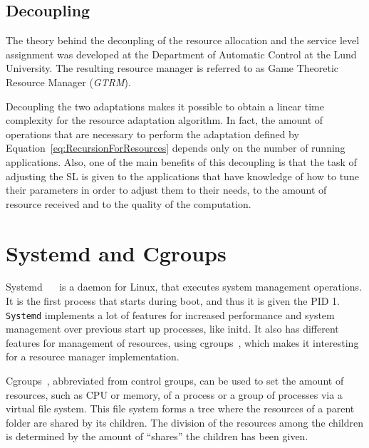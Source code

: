 \documentclass[nobiblatex]{LTHthesis}
\begin{document}
\subsection{Decoupling}

The theory behind the decoupling of the resource allocation and the service
level assignment was developed at the Department of Automatic Control at
the Lund University. The resulting resource manager is referred to as Game 
Theoretic Resource Manager (\emph{GTRM}).

Decoupling the two adaptations makes it possible to obtain a linear time
complexity for the resource adaptation algorithm. In fact, the amount of
operations that are necessary to perform the adaptation defined by
Equation~\ref{eq:RecursionForResources} depends only on the number of
running applications. Also, one of the main benefits of this decoupling is
that the task of adjusting the SL is given to the applications that have
knowledge of how to tune their parameters in order to adjust them to their
needs, to the amount of resource received and to the quality of the 
computation.

\section{Systemd and Cgroups}
\label{sec:systemdandcroups}
Systemd ~\cite{sysd1}~\cite{sysd2} is a daemon for Linux, that executes system
management operations. It is the first process that starts during boot, and 
thus it is given the PID 1. \texttt{Systemd} implements a lot of features for increased
performance and system management over previous start up processes, like
initd. It also has different features for management of resources, using
cgroups~\cite{cgroups}, which makes it interesting for a resource manager
implementation. 

Cgroups~\cite{cgroups}, abbreviated from control groups, can be used to set
the amount of resources, such as CPU or memory, of a process or a group of
processes via a virtual file system. This file system forms a tree where the
resources of a parent folder are shared by its children. The division of the
resources among the children is determined by the amount of ``shares'' the
children has been given. 
\end{document}

